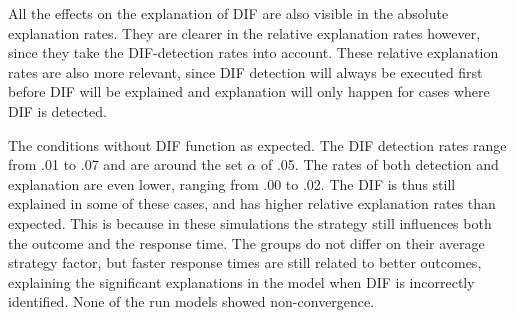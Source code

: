 \documentclass{interact}
\begin{document}
All the effects on the explanation of DIF are also visible in the absolute explanation rates. They are clearer in the relative explanation rates however, since they take the DIF-detection rates into account. These relative explanation rates are also more relevant, since DIF detection will always be executed first before DIF will be explained and explanation will only happen for cases where DIF is detected.

The conditions without DIF function as expected. The DIF detection rates range from .01 to .07 and are around the set $\alpha$ of .05. The rates of both detection and explanation are even lower, ranging from .00 to .02. The DIF is thus still explained in some of these cases, and has higher relative explanation rates than expected. This is because in these simulations the strategy still influences both the outcome and the response time. The groups do not differ on their average strategy factor, but faster response times are still related to better outcomes, explaining the significant explanations in the model when DIF is incorrectly identified. None of the run models showed non-convergence.
\end{document}
